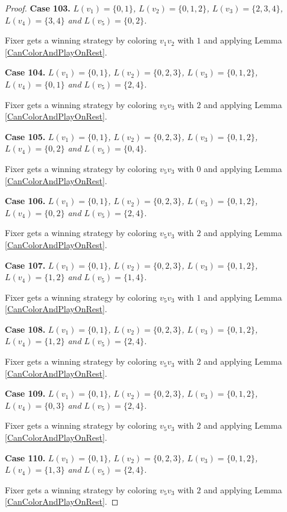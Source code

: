 \documentclass[12pt]{amsart}
\theoremstyle{plain}
\theoremstyle{definition}
\theoremstyle{remark}
\begin{document}
\begin{proof}
\noindent\textbf{Case 103.  }\textit{$L(v_1) = \{0, 1\}$, $L(v_2) = \{0, 1, 2\}$, $L(v_3) = \{2, 3, 4\}$, $L(v_4) = \{3, 4\}$ and $L(v_5) = \{0, 2\}$.}

Fixer gets a winning strategy by coloring $v_1v_2$ with $1$ and applying Lemma \ref{CanColorAndPlayOnRest}.

\noindent\textbf{Case 104.  }\textit{$L(v_1) = \{0, 1\}$, $L(v_2) = \{0, 2, 3\}$, $L(v_3) = \{0, 1, 2\}$, $L(v_4) = \{0, 1\}$ and $L(v_5) = \{2, 4\}$.}

Fixer gets a winning strategy by coloring $v_5v_3$ with $2$ and applying Lemma \ref{CanColorAndPlayOnRest}.

\noindent\textbf{Case 105.  }\textit{$L(v_1) = \{0, 1\}$, $L(v_2) = \{0, 2, 3\}$, $L(v_3) = \{0, 1, 2\}$, $L(v_4) = \{0, 2\}$ and $L(v_5) = \{0, 4\}$.}

Fixer gets a winning strategy by coloring $v_5v_3$ with $0$ and applying Lemma \ref{CanColorAndPlayOnRest}.

\noindent\textbf{Case 106.  }\textit{$L(v_1) = \{0, 1\}$, $L(v_2) = \{0, 2, 3\}$, $L(v_3) = \{0, 1, 2\}$, $L(v_4) = \{0, 2\}$ and $L(v_5) = \{2, 4\}$.}

Fixer gets a winning strategy by coloring $v_5v_3$ with $2$ and applying Lemma \ref{CanColorAndPlayOnRest}.

\noindent\textbf{Case 107.  }\textit{$L(v_1) = \{0, 1\}$, $L(v_2) = \{0, 2, 3\}$, $L(v_3) = \{0, 1, 2\}$, $L(v_4) = \{1, 2\}$ and $L(v_5) = \{1, 4\}$.}

Fixer gets a winning strategy by coloring $v_5v_3$ with $1$ and applying Lemma \ref{CanColorAndPlayOnRest}.

\noindent\textbf{Case 108.  }\textit{$L(v_1) = \{0, 1\}$, $L(v_2) = \{0, 2, 3\}$, $L(v_3) = \{0, 1, 2\}$, $L(v_4) = \{1, 2\}$ and $L(v_5) = \{2, 4\}$.}

Fixer gets a winning strategy by coloring $v_5v_3$ with $2$ and applying Lemma \ref{CanColorAndPlayOnRest}.

\noindent\textbf{Case 109.  }\textit{$L(v_1) = \{0, 1\}$, $L(v_2) = \{0, 2, 3\}$, $L(v_3) = \{0, 1, 2\}$, $L(v_4) = \{0, 3\}$ and $L(v_5) = \{2, 4\}$.}

Fixer gets a winning strategy by coloring $v_5v_3$ with $2$ and applying Lemma \ref{CanColorAndPlayOnRest}.

\noindent\textbf{Case 110.  }\textit{$L(v_1) = \{0, 1\}$, $L(v_2) = \{0, 2, 3\}$, $L(v_3) = \{0, 1, 2\}$, $L(v_4) = \{1, 3\}$ and $L(v_5) = \{2, 4\}$.}

Fixer gets a winning strategy by coloring $v_5v_3$ with $2$ and applying Lemma \ref{CanColorAndPlayOnRest}.


\end{proof}
\end{document}

